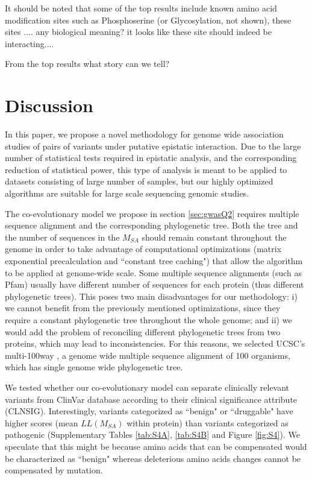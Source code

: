 It should be noted that some of the top results include known amino acid modification sites such as Phosphoserine (or Glycosylation, not shown), these sites .... {\huge any biological meaning? it looks like these site should indeed be interacting...}.

From the top results {\huge what story can we tell?}

\section{Discussion}

In this paper, we propose a novel methodology for genome wide association studies of pairs of variants under putative epistatic interaction. Due to the large number of statistical tests required in epistatic analysis, and the corresponding reduction of statistical power, this type of analysis is meant to be applied to datasets consisting of large number of samples, but our highly optimized algorithms are suitable for large scale sequencing genomic studies.

The co-evolutionary model we propose in section \ref{sec:gwasQ2} requires multiple sequence alignment and the corresponding phylogenetic tree. Both the tree and the number of sequences in the $M_{SA}$ should remain constant throughout the genome in order to take advantage of computational optimizations (matrix exponential precalculation and ``constant tree caching") that allow the algorithm to be applied at genome-wide scale. Some multiple sequence alignments (such as Pfam) usually have different number of sequences for each protein (thus different phylogenetic trees). This poses two main disadvantages for our methodology: i) we cannot benefit from the previously mentioned optimizations, since they require a constant phylogenetic tree throughout the whole genome; and ii) we would add the problem of reconciling different phylogenetic trees from two proteins, which may lead to inconsistencies. For this reasons, we selected UCSC's multi-100way \cite{karolchik2014ucsc}, a genome wide multiple sequence alignment of 100 organisms, which has single genome wide phylogenetic tree.

We tested whether our co-evolutionary model can separate clinically relevant variants from ClinVar database \cite{landrum2013clinvar} according to their clinical significance attribute (CLNSIG). Interestingly, variants categorized as ``benign" or ``druggable" have higher scores (mean $LL(M_{SA})$ within protein) than variants categorized as pathogenic (Supplementary Tables \ref{tab:S4A}, \ref{tab:S4B} and Figure \ref{fig:S4}). We speculate that this might be because amino acids that can be compensated would be characterized as ``benign" whereas deleterious amino acids changes cannot be compensated by mutation. 

